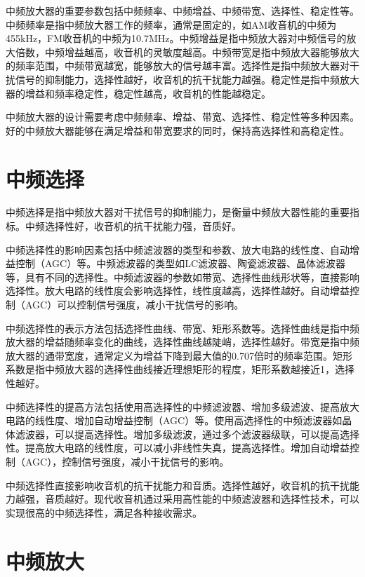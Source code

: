 \documentclass[12pt,UTF8]{ctexbook}
\begin{document}
中频放大器的重要参数包括中频频率、中频增益、中频带宽、选择性、稳定性等。中频频率是指中频放大器工作的频率，通常是固定的，如AM收音机的中频为455kHz，FM收音机的中频为10.7MHz。中频增益是指中频放大器对中频信号的放大倍数，中频增益越高，收音机的灵敏度越高。中频带宽是指中频放大器能够放大的频率范围，中频带宽越宽，能够放大的信号越丰富。选择性是指中频放大器对干扰信号的抑制能力，选择性越好，收音机的抗干扰能力越强。稳定性是指中频放大器的增益和频率稳定性，稳定性越高，收音机的性能越稳定。

中频放大器的设计需要考虑中频频率、增益、带宽、选择性、稳定性等多种因素。好的中频放大器能够在满足增益和带宽要求的同时，保持高选择性和高稳定性。

\section{中频选择}

中频选择是指中频放大器对干扰信号的抑制能力，是衡量中频放大器性能的重要指标。中频选择性好，收音机的抗干扰能力强，音质好。

中频选择性的影响因素包括中频滤波器的类型和参数、放大电路的线性度、自动增益控制（AGC）等。中频滤波器的类型如LC滤波器、陶瓷滤波器、晶体滤波器等，具有不同的选择性。中频滤波器的参数如带宽、选择性曲线形状等，直接影响选择性。放大电路的线性度会影响选择性，线性度越高，选择性越好。自动增益控制（AGC）可以控制信号强度，减小干扰信号的影响。

中频选择性的表示方法包括选择性曲线、带宽、矩形系数等。选择性曲线是指中频放大器的增益随频率变化的曲线，选择性曲线越陡峭，选择性越好。带宽是指中频放大器的通带宽度，通常定义为增益下降到最大值的0.707倍时的频率范围。矩形系数是指中频放大器的选择性曲线接近理想矩形的程度，矩形系数越接近1，选择性越好。

中频选择性的提高方法包括使用高选择性的中频滤波器、增加多级滤波、提高放大电路的线性度、增加自动增益控制（AGC）等。使用高选择性的中频滤波器如晶体滤波器，可以提高选择性。增加多级滤波，通过多个滤波器级联，可以提高选择性。提高放大电路的线性度，可以减小非线性失真，提高选择性。增加自动增益控制（AGC），控制信号强度，减小干扰信号的影响。

中频选择性直接影响收音机的抗干扰能力和音质。选择性越好，收音机的抗干扰能力越强，音质越好。现代收音机通过采用高性能的中频滤波器和选择性技术，可以实现很高的中频选择性，满足各种接收需求。

\section{中频放大}
\end{document}
